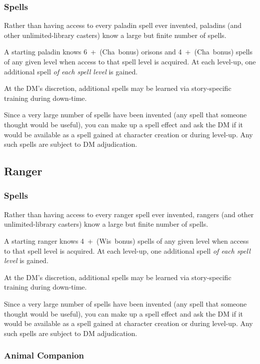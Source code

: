 \subsubsection{Spells}

Rather than having access to every paladin spell ever invented, paladins
(and other unlimited-library casters) know a large but finite number of
spells.

A starting paladin knows 6~+~(Cha~bonus) orisons and 4~+~(Cha~bonus)
spells of any given level when access to that spell level is acquired.
At each level-up, one additional spell \textit{of each spell level} is
gained.

At the DM's discretion, additional spells may be learned via story-specific
training during down-time.

Since a very large number of spells have been invented (any spell that
someone thought would be useful), you can make up a spell effect and ask
the DM if it would be available as a spell gained at character creation or
during level-up. Any such spells are subject to DM adjudication.
%

%
\subsection{Ranger}

\subsubsection{Spells}

Rather than having access to every ranger spell ever invented, rangers
(and other unlimited-library casters) know a large but finite number of
spells.

A starting ranger knows 4~+~(Wis~bonus) spells of any given level when
access to that spell level is acquired. At each level-up, one additional
spell \textit{of each spell level} is gained.

At the DM's discretion, additional spells may be learned via story-specific
training during down-time.

Since a very large number of spells have been invented (any spell that
someone thought would be useful), you can make up a spell effect and ask
the DM if it would be available as a spell gained at character creation or
during level-up. Any such spells are subject to DM adjudication.

\subsubsection{Animal Companion}

